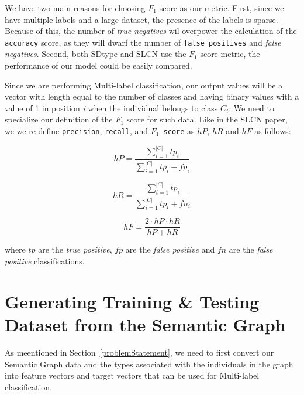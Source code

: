 \documentclass[runningheads,a4paper]{llncs}
\begin{document}
We have two main reasons for choosing  $F_1$-score as our metric. First, since we have multiple-labels and a large dataset, the presence of the labels is sparse. Because of this, the number of \textit{true negatives} wil overpower the calculation of the \texttt{accuracy} score, as they will dwarf the number of \texttt{false positives} and \textit{false negatives}. Second, both SDtype\cite{paulheim2013type} and SLCN\cite{melo2016type} use the $F_1$-score metric, the performance of our model could be easily compared.

Since we are performing Multi-label classification, our output values will be a vector with length equal to the number of classes and having binary values with a value of 1 in position \textit{i} when the individual belongs to class $C_i$. We need to specialize our definition of the $F_1$ score for such data. Like in the SLCN\cite{melo2016type} paper, we we re-define  \texttt{precision}, \texttt{recall}, and \texttt{$F_1$-score} as $hP$, $hR$ and $hF$ as follows:

\[hP = \frac{\displaystyle\sum_{i=1}^{|C|} tp_i}{\displaystyle\sum_{i=1}^{|C|} tp_i + fp_i}\]

\[hR= \frac{\displaystyle\sum_{i=1}^{|C|} tp_i}{\displaystyle\sum_{i=1}^{|C|} tp_i + fn_i}\]

\[hF = \frac{2 \cdot hP \cdot hR}{hP + hR}\]

where $tp$ are the \textit{true positive}, $fp$ are the \textit{false positive} and $fn$ are the \textit{false positive} classifications. 


\section{Generating Training \& Testing Dataset from the Semantic Graph}
As meentioned in Section~\ref{problemStatement}, we need to first convert our Semantic Graph data and the types associated with the individuals in the graph into feature vectors and target vectors that can be used for Multi-label classification. 
\end{document}
